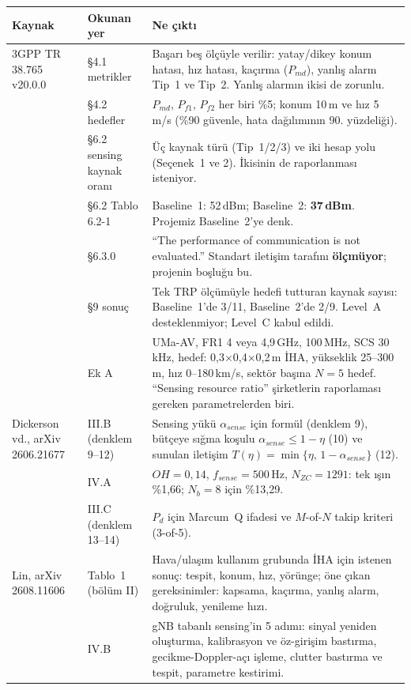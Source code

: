 \documentclass[10.5pt,a4paper]{article}
\begin{document}
\begingroup\sffamily\small
\begin{xltabular}{\textwidth}{@{}p{3.1cm}p{3.4cm}X@{}}
\toprule
\textbf{Kaynak} & \textbf{Okunan yer} & \textbf{Ne çıktı} \\
\midrule
3GPP TR 38.765 v20.0.0 & §4.1 metrikler & Başarı beş ölçüyle verilir: yatay/dikey konum hatası, hız hatası, kaçırma ($P_{md}$), yanlış alarm Tip~1 ve Tip~2. Yanlış alarmın ikisi de zorunlu. \\
 & §4.2 hedefler & $P_{md}$, $P_{f1}$, $P_{f2}$ her biri \%5; konum 10\,m ve hız 5\,m/s (\%90 güvenle, hata dağılımının 90. yüzdeliği). \\
 & §6.2 sensing kaynak oranı & Üç kaynak türü (Tip~1/2/3) ve iki hesap yolu (Seçenek~1 ve 2). İkisinin de raporlanması isteniyor. \\
 & §6.2 Tablo 6.2-1 & Baseline~1: 52\,dBm; Baseline~2: \textbf{37\,dBm}. Projemiz Baseline~2'ye denk. \\
 & §6.3.0 & ``The performance of communication is not evaluated.'' Standart iletişim tarafını \textbf{ölçmüyor}; projenin boşluğu bu. \\
 & §9 sonuç & Tek TRP ölçümüyle hedefi tutturan kaynak sayısı: Baseline~1'de 3/11, Baseline~2'de 2/9. Level~A desteklenmiyor; Level~C kabul edildi. \\
 & Ek A & UMa-AV, FR1 4 veya 4,9\,GHz, 100\,MHz, SCS 30\,kHz, hedef: 0,3$\times$0,4$\times$0,2\,m İHA, yükseklik 25--300\,m, hız 0--180\,km/s, sektör başına $N=5$ hedef. ``Sensing resource ratio'' şirketlerin raporlaması gereken parametrelerden biri. \\
\midrule
Dickerson vd., arXiv 2606.21677 & III.B (denklem 9--12) & Sensing yükü $\alpha_{sense}$ için formül (denklem 9), bütçeye sığma koşulu $\alpha_{sense}\le 1-\eta$ (10) ve sunulan iletişim $T(\eta)=\min\{\eta,\,1-\alpha_{sense}\}$ (12). \\
 & IV.A & $OH=0{,}14$, $f_{sense}=500$\,Hz, $N_{ZC}=1291$: tek ışın \%1,66; $N_b=8$ için \%13,29. \\
 & III.C (denklem 13--14) & $P_d$ için Marcum~Q ifadesi ve $M$-of-$N$ takip kriteri (3-of-5). \\
\midrule
Lin, arXiv 2608.11606 & Tablo~1 (bölüm II) & Hava/ulaşım kullanım grubunda İHA için istenen sonuç: tespit, konum, hız, yörünge; öne çıkan gereksinimler: kapsama, kaçırma, yanlış alarm, doğruluk, yenileme hızı. \\
 & IV.B & gNB tabanlı sensing'in 5 adımı: sinyal yeniden oluşturma, kalibrasyon ve öz-girişim bastırma, gecikme-Doppler-açı işleme, clutter bastırma ve tespit, parametre kestirimi. \\
\bottomrule
\end{xltabular}
\endgroup
\end{document}
